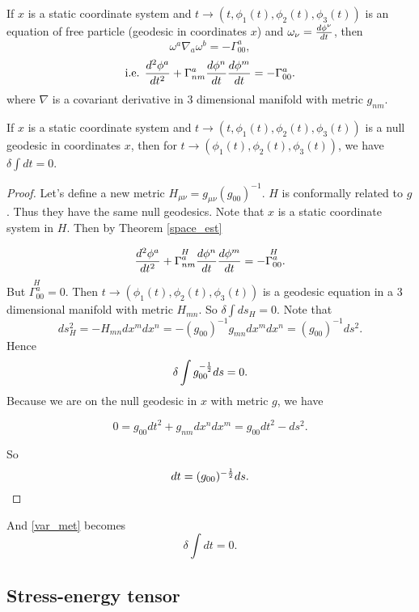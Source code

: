 \documentclass[main.tex]{subfiles}
\begin{document}
\begin{theorem}
\label{space_est}
If $x$ is a static coordinate system and $t\to(t,\phi_1(t), \phi_2(t), \phi_3(t))$ is an equation of free particle (geodesic in coordinates $x$) and $\omega_\nu = {d\phi^\nu \over dt}$, then
\begin{equation}
\omega^a \nabla_a \omega^b = - \Gamma^a_{00},
\end{equation}
\begin{equation}
\text{i.e.  } {d^2\phi^a \over dt^2} + \Gamma^a_{nm} {d\phi^n \over dt} {d\phi^m \over dt} = - \Gamma^a_{00}.
\end{equation}
where $\nabla$ is a covariant derivative in 3 dimensional manifold with metric $g_{nm}$.
\end{theorem}

\begin{theorem}
If $x$ is a static coordinate system and $t\to(t,\phi_1(t), \phi_2(t), \phi_3(t))$ is a null geodesic in coordinates $x$, then for $t\to(\phi_1(t), \phi_2(t), \phi_3(t))$, we have $\delta\int dt = 0$.
\end{theorem}
\begin{proof}
Let's define a new metric $H_{\mu\nu} = g_{\mu\nu}(g_{00})^{-1}$. $H$ is conformally related to $g$. Thus they have the same null geodesics. Note that $x$ is a static coordinate system in $H$. Then by Theorem \ref{space_est}

\begin{equation}
{d^2\phi^a \over dt^2} + \overset{H}{\Gamma^a_{nm}} {d\phi^n \over dt} {d\phi^m \over dt} = - \overset{H}{\Gamma^a_{00}}.
\end{equation} 
But $\overset{H}{\Gamma^a_{00}} = 0$. Then $t\to(\phi_1(t), \phi_2(t), \phi_3(t))$ is a geodesic equation in a 3 dimensional manifold with metric $H_{mn}$. So $\delta \int ds_H = 0$. Note that
$$
ds^2_H = - H_{mn}dx^m dx^n = - (g_{00})^{-1}g_{mn}dx^m dx^n = (g_{00})^{-1} ds^2.
$$ 
Hence
\begin{equation}
\label{var_met}
\delta \int g_{00}^{- {1 \over 2}}ds = 0.
\end{equation}
Because we are on the null geodesic in $x$ with metric $g$, we have

$$
0 = g_{00}dt^2 + g_{nm}dx^ndx^m = g_{00} dt^2 - ds^2.
$$

So
$$
dt = (g_{00})^{- {1 \over 2}}ds.
$$
\end{proof}
And \ref{var_met} becomes
$$
\delta\int dt = 0.
$$
\subsection{Stress-energy tensor}
\end{document}
